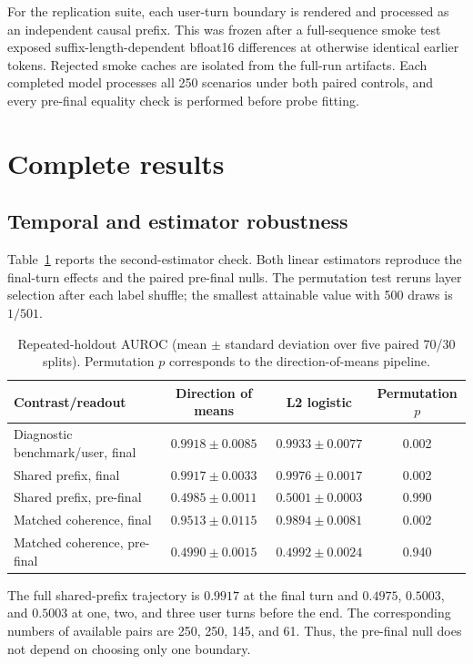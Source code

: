 \documentclass{article}
\begin{document}
For the replication suite, each user-turn boundary is rendered and processed
as an independent causal prefix. This was frozen after a full-sequence smoke
test exposed suffix-length-dependent bfloat16 differences at otherwise
identical earlier tokens. Rejected smoke caches are isolated from the full-run
artifacts. Each completed model processes all 250 scenarios under both paired
controls, and every pre-final equality check is performed before probe fitting.

\section{Complete results}
\label{app:results}

\subsection{Temporal and estimator robustness}

Table~\ref{tab:appendix-estimators} reports the second-estimator check. Both
linear estimators reproduce the final-turn effects and the paired pre-final
nulls. The permutation test reruns layer selection after each label shuffle;
the smallest attainable value with 500 draws is $1/501$.

\begin{table}[h]
  \caption{Repeated-holdout AUROC (mean $\mathbin{\pm}$ standard deviation over
  five paired 70/30 splits). Permutation $p$ corresponds to the
  direction-of-means pipeline.}
  \label{tab:appendix-estimators}
  \centering
  \small
  \begin{tabular}{lccc}
    \toprule
    Contrast/readout & Direction of means & L2 logistic & Permutation $p$ \\
    \midrule
    Diagnostic benchmark/user, final & $0.9918\pm0.0085$ & $0.9933\pm0.0077$ & 0.002 \\
    Shared prefix, final & $0.9917\pm0.0033$ & $0.9976\pm0.0017$ & 0.002 \\
    Shared prefix, pre-final & $0.4985\pm0.0011$ & $0.5001\pm0.0003$ & 0.990 \\
    Matched coherence, final & $0.9513\pm0.0115$ & $0.9894\pm0.0081$ & 0.002 \\
    Matched coherence, pre-final & $0.4990\pm0.0015$ & $0.4992\pm0.0024$ & 0.940 \\
    \bottomrule
  \end{tabular}
\end{table}

The full shared-prefix trajectory is $0.9917$ at the final turn and $0.4975$,
$0.5003$, and $0.5003$ at one, two, and three user turns before the end. The
corresponding numbers of available pairs are 250, 250, 145, and 61. Thus, the
pre-final null does not depend on choosing only one boundary.
\end{document}
